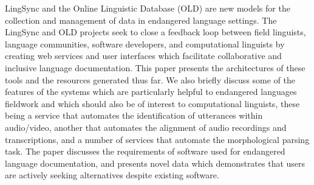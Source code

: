 LingSync and the Online Linguistic Database (OLD) are new models for the collection and management of data in endangered language settings. The LingSync and OLD projects seek to close a feedback loop between field linguists, language communities, software developers, and computational linguists by creating web services and user interfaces which facilitate collaborative and inclusive language documentation. This paper presents the architectures of these tools and the resources generated thus far. We also briefly discuss some of the features of the systems which are particularly helpful to endangered languages fieldwork and which should also be of interest to computational linguists, these being a service that automates the identification of utterances within audio/video, another that automates the alignment of audio recordings and transcriptions, and a number of services that automate the morphological parsing task. The paper discusses the requirements of software used for endangered language documentation, and presents novel data which demonstrates that users are actively seeking alternatives despite existing software.
